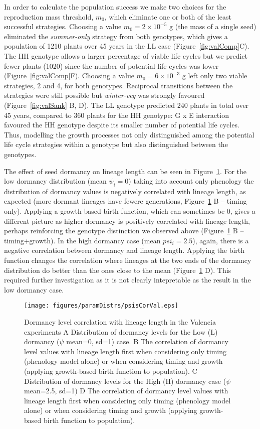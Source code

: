 In order to calculate the population success we make two choices for the
reproduction mass threshold, \(m_{0}\), which eliminate one or both of the least
successful strategies. Choosing a value \(m_{0} = 2 \times 10^{- 5}\) g (the
mass of a single seed) eliminated the \emph{summer-only} strategy from both
genotypes, which gives a population of 1210 plants over 45 years in the LL case
(Figure~\ref{fig:valComp}C). The HH genotype allows a larger percentage of
viable life cycles but we predict fewer plants (1020) since the number of
potential life cycles was lower (Figure~\ref{fig:valComp}F). Choosing a value
\(m_{0} = 6 \times 10^{- 3}\) g left only two viable strategies, 2 and 4, for
both genotypes. Reciprocal transitions between the strategies were still
possible but \emph{winter-veg} was strongly favoured (Figure~\ref{fig:valSank}
B, D). The LL genotype predicted 240 plants in total over 45 years, compared to
360 plants for the HH genotype: G x E interaction favoured the HH genotype
despite its smaller number of potential life cycles. Thus, modelling the growth
processes not only distinguished among the potential life cycle strategies
within a genotype but also distinguished between the genotypes.

The effect of seed dormancy on lineage length can be seen in
Figure~\ref{fig:psisCorVal}. For the low dormancy distribution (mean $\psi_i=0$)
taking into account only phenology the distribution of dormancy values is
negatively correlated with lineage length, as expected (more dormant lineages
have fewere generations, Figure~\ref{fig:psisCorVal} B -- timing only). Applying
a growth-based birth function, which can sometimes be $0$, gives a different
picture as higher dormancy is positively correlated with lineage length, perhaps
reinforcing the genotype distinction we observed above (Figure~\ref{fig:psisCorVal}
B -- timing+growth). In the high dormancy case (mean $psi_i =2.5$), again, there
is a negative correlation between dormancy and lineage length. Applying the
birth function changes the correlation where lineages at the two ends of the
dormancy distribution do better than the ones close to the mean
(Figure~\ref{fig:psisCorVal} D). This required further investigation as it is not
clearly intepretable as the result in the low dormancy case.

\begin{figure}[tb]
  \centering
  \texttt{[image: figures/paramDistrs/psisCorVal.eps]}
  \caption{Dormancy level correlation with lineage length in the Valencia
    experiments A Distribution of dormancy levels for the Low (L) dormancy
    ($\psi$ mean=0, sd=1) case. B The correlation of dormancy level values with
    lineage length first when considering only timing (phenology model alone) or
    when considering timing and growth (applying growth-based birth function to
    population). C Distribution of dormancy levels for the High (H) dormancy
    case ($\psi$ mean=2.5, sd=1) D The correlation of dormancy level values with
    lineage length first when considering only timing (phenology model alone) or
    when considering timing and growth (applying growth-based birth function to
    population).}
  \label{fig:psisCorVal}
\end{figure}





